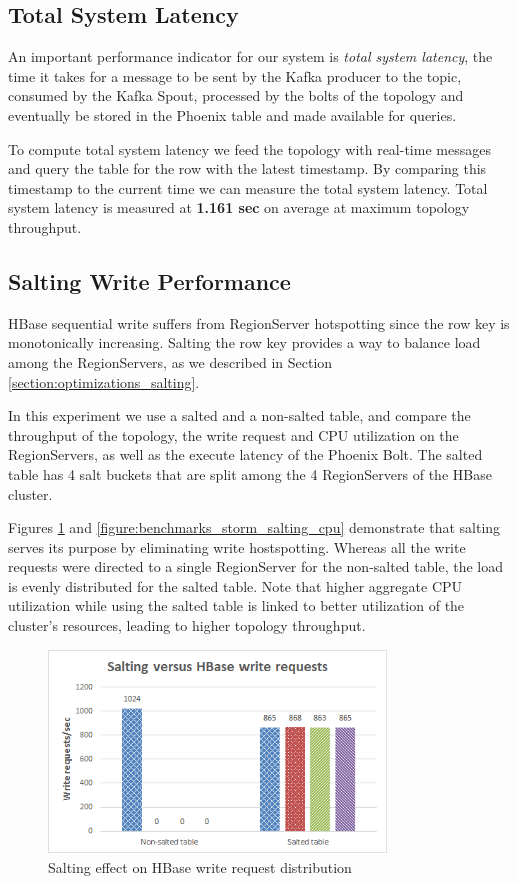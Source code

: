\subsection{Total System Latency}

An important performance indicator for our system is \emph{total system latency}, the time it takes for a message to be sent by the Kafka producer to the topic, consumed by the Kafka Spout, processed by the bolts of the topology and eventually be stored in the Phoenix table and made available for queries.

To compute total system latency we feed the topology with real-time messages and query the table for the row with the latest timestamp. By comparing this timestamp to the current time we can measure the total system latency. Total system latency is measured at \textbf{1.161 sec} on average at maximum topology throughput.

\subsection{Salting Write Performance}\label{subsection:benchmarks_storm_salting}

HBase sequential write suffers from RegionServer hotspotting since the row key is monotonically increasing. Salting the row key provides a way to balance load among the RegionServers, as we described in Section \ref{section:optimizations_salting}.

In this experiment we use a salted and a non-salted table, and compare the throughput of the topology, the write request and CPU utilization on the RegionServers, as well as the execute latency of the Phoenix Bolt. The salted table has 4 salt buckets that are split among the 4 RegionServers of the HBase cluster.

Figures \ref{figure:benchmarks_storm_salting_requests} and \ref{figure:benchmarks_storm_salting_cpu} demonstrate that salting serves its purpose by eliminating write hostspotting. Whereas all the write requests were directed to a single RegionServer for the non-salted table, the load is evenly distributed for the salted table. Note that higher aggregate CPU utilization while using the salted table is linked to better utilization of the cluster's resources, leading to higher topology throughput.

\begin{figure}[H]
\centering
\includegraphics[width=0.8\textwidth]{figures/benchmarks_storm_salting_requests}
\caption{Salting effect on HBase write request distribution}
\label{figure:benchmarks_storm_salting_requests}
\end{figure}

